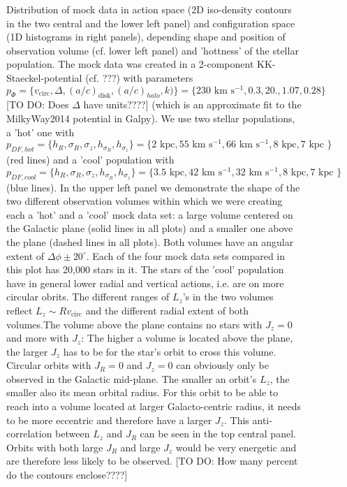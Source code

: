 

\begin{figure}[H]
\caption{Distribution of mock data in action space (2D iso-density contours in the two central and the lower left panel) and configuration space (1D histograms in right panels), depending shape and position of observation volume (cf. lower left panel) and 'hottness' of the stellar population. The mock data was created in a 2-component KK-Staeckel-potential (cf. ???) with parameters $p_\Phi = \{v_\text{circ}, \Delta, (a/c)_\text{disk},(a/c)_{halo},k)\} = \{230\text{ km s$^{-1}$},0.3,20.,1.07, 0.28\}$ [TO DO: Does $\Delta$ have units????] (which is an approximate fit to the MilkyWay2014 potential in Galpy). We use two stellar populations, a 'hot' one with $p_{DF,hot} = \{ h_R, \sigma_R, \sigma_z,h_{\sigma_R},h_{\sigma_z}\} =\{2 \text{ kpc}, 55 \text{ km s$^{-1}$}, 66 \text{ km s$^{-1}$}, 8 \text{ kpc}, 7 \text{ kpc }\} $ (red lines) and a 'cool' population with $p_{DF,cool} = \{ h_R, \sigma_R, \sigma_z,h_{\sigma_R},h_{\sigma_z}\} =\{3.5 \text{ kpc}, 42 \text{ km s$^{-1}$}, 32 \text{ km s$^{-1}$}, 8 \text{ kpc}, 7 \text{ kpc }\} $ (blue lines). In the upper left panel we demonstrate the shape of the two different observation volumes within which we were creating each a 'hot' and a 'cool' mock data set: a large volume centered on the Galactic plane (solid lines in all plots) and a smaller one above the plane (dashed lines in all plots). Both volumes have an angular extent of $\Delta\phi \pm 20^\circ$. Each of the four mock data sets compared in this plot has 20,000 stars in it. The stars of the 'cool' population have in general lower radial and vertical actions, i.e. are on more circular obrits. The different ranges of $L_z$'s in the two volumes reflect $L_z \sim R  v_\text{circ}$ and the different radial extent of both volumes.The volume above the plane contains no stars with $J_z = 0$ and more with $J_z$: The higher a volume is located above the plane, the larger $J_z$ has to be for the star's orbit to cross this volume. Circular orbits with $J_R = 0$ and $J_z = 0$ can obviously only be observed in the Galactic mid-plane. The smaller an orbit's $L_z$, the smaller also its mean orbital radius. For this orbit to be able to reach into a volume located at larger Galacto-centric radius, it needs to be more eccentric and therefore have a larger $J_z$. This anti-correlation between $L_z$ and $J_R$ can be seen in the top central panel. Orbits with both large $J_R$ and large $J_z$ would be very energetic and are therefore less likely to be observed. [TO DO: How many percent do the contours enclose????]} 
\label{fig:mockdatadistr}
\end{figure}
